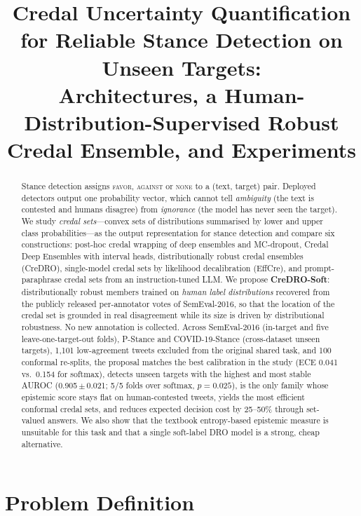 \documentclass[11pt,a4paper]{article}
\title{Credal Uncertainty Quantification for Reliable Stance Detection on Unseen Targets:\\
Architectures, a Human-Distribution-Supervised Robust Credal Ensemble, and Experiments}
\author{}
\date{}
\begin{document}
\maketitle
\vspace{-3em}

\begin{abstract}
\noindent
Stance detection assigns \textsc{favor}, \textsc{against} or \textsc{none} to a (text, target) pair. Deployed detectors output one probability vector, which cannot tell \emph{ambiguity} (the text is contested and humans disagree) from \emph{ignorance} (the model has never seen the target). We study \emph{credal sets}---convex sets of distributions summarised by lower and upper class probabilities---as the output representation for stance detection and compare six constructions: post-hoc credal wrapping of deep ensembles and MC-dropout, Credal Deep Ensembles with interval heads, distributionally robust credal ensembles (CreDRO), single-model credal sets by likelihood decalibration (EffCre), and prompt-paraphrase credal sets from an instruction-tuned LLM. We propose \textbf{CreDRO-Soft}: distributionally robust members trained on \emph{human label distributions} recovered from the publicly released per-annotator votes of SemEval-2016, so that the location of the credal set is grounded in real disagreement while its size is driven by distributional robustness. No new annotation is collected. Across SemEval-2016 (in-target and five leave-one-target-out folds), P-Stance and COVID-19-Stance (cross-dataset unseen targets), 1{,}101 low-agreement tweets excluded from the original shared task, and 100 conformal re-splits, the proposal matches the best calibration in the study (ECE 0.041 vs.\ 0.154 for softmax), detects unseen targets with the highest and most stable AUROC (0.905\,$\pm$\,0.021; 5/5 folds over softmax, $p=0.025$), is the only family whose epistemic score stays flat on human-contested tweets, yields the most efficient conformal credal sets, and reduces expected decision cost by 25--50\% through set-valued answers. We also show that the textbook entropy-based epistemic measure is unsuitable for this task and that a single soft-label DRO model is a strong, cheap alternative.
\end{abstract}

\tableofcontents
\newpage

\section{Problem Definition}
\end{document}
